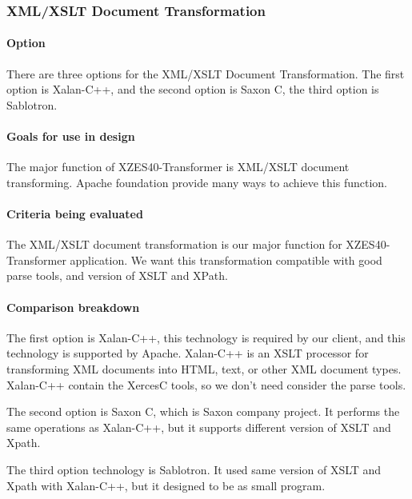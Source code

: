 \subsubsection{XML/XSLT Document Transformation}

\paragraph{Option}

There are three options for the XML/XSLT Document Transformation.
The first option is Xalan-C++, and the second option is Saxon C, the third option is Sablotron.

\paragraph{Goals for use in design}

The major function of XZES40-Transformer is XML/XSLT document transforming.
Apache foundation provide many ways to achieve this function.

\paragraph{Criteria being evaluated}

The XML/XSLT document transformation is our major function for XZES40-Transformer application.
We want this transformation compatible with good parse tools, and version of XSLT and XPath.

\paragraph{Comparison breakdown}

The first option is Xalan-C++, this technology is required by our client, and this technology is supported by Apache.
Xalan-C++ is an XSLT processor for transforming XML documents into HTML, text, or other XML document types.
Xalan-C++ contain the XercesC tools, so we don't need consider the parse tools.

The second option is Saxon C, which is Saxon company project.
It performs the same operations as Xalan-C++, but it supports different version of XSLT and Xpath.

The third option technology is Sablotron.
It used same version of XSLT and Xpath with Xalan-C++, but it designed to be as small program.

